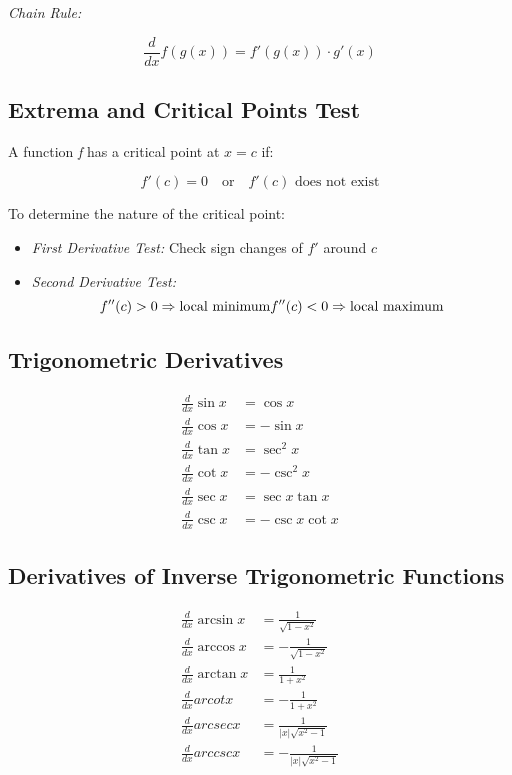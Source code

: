 \emph{Chain Rule:}

\[
    \frac{d}{dx} f(g(x)) = f'(g(x)) \cdot g'(x)
\]

\subsection{Extrema and Critical Points Test}

A function \emph{f} has a critical point at \(x = c\) if:

\[
    f'(c) = 0 \quad \text{or} \quad f'(c) \text{ does not exist}
\]

To determine the nature of the critical point:

\begin{itemize}

    \item \emph{First Derivative Test:} Check sign changes of \(f'\) around \(c\)

    \item \emph{Second Derivative Test:}
    \[
        f''(c) > 0 \Rightarrow \text{local minimum} \\
        f''(c) < 0 \Rightarrow \text{local maximum}
    \]
\end{itemize}

\subsection{Trigonometric Derivatives}

\begin{align*}
    \frac{d}{dx} \sin x &= \cos x \\
    \frac{d}{dx} \cos x &= -\sin x \\
    \frac{d}{dx} \tan x &= \sec^2 x \\
    \frac{d}{dx} \cot x &= -\csc^2 x \\
    \frac{d}{dx} \sec x &= \sec x \tan x \\
    \frac{d}{dx} \csc x &= -\csc x \cot x
\end{align*}

\subsection{Derivatives of Inverse Trigonometric Functions}

\begin{align*}
    \frac{d}{dx} \arcsin x &= \frac{1}{\sqrt{1 - x^2}} \\
    \frac{d}{dx} \arccos x &= -\frac{1}{\sqrt{1 - x^2}} \\
    \frac{d}{dx} \arctan x &= \frac{1}{1 + x^2} \\
    \frac{d}{dx} arcot x &= -\frac{1}{1 + x^2} \\
    \frac{d}{dx} arcsec x &= \frac{1}{|x|\sqrt{x^2 - 1}} \\
    \frac{d}{dx} arccsc x &= -\frac{1}{|x|\sqrt{x^2 - 1}}
\end{align*}

